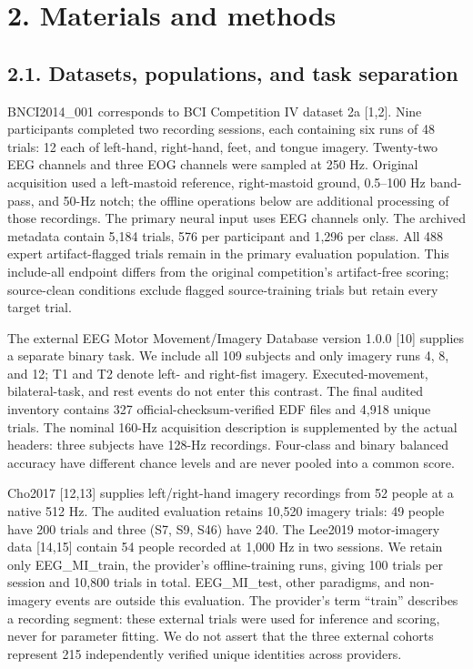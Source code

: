 \documentclass[11pt]{article}
\begin{document}
\section*{2. Materials and methods}
\subsection*{2.1. Datasets, populations, and task separation}
BNCI2014\_001 corresponds to BCI Competition IV dataset 2a [1,2]. Nine participants completed two recording sessions, each containing six runs of 48 trials: 12 each of left-hand, right-hand, feet, and tongue imagery. Twenty-two EEG channels and three EOG channels were sampled at 250 Hz. Original acquisition used a left-mastoid reference, right-mastoid ground, 0.5--100 Hz band-pass, and 50-Hz notch; the offline operations below are additional processing of those recordings. The primary neural input uses EEG channels only. The archived metadata contain 5,184 trials, 576 per participant and 1,296 per class. All 488 expert artifact-flagged trials remain in the primary evaluation population. This include-all endpoint differs from the original competition's artifact-free scoring; source-clean conditions exclude flagged source-training trials but retain every target trial.

The external EEG Motor Movement/Imagery Database version 1.0.0 [10] supplies a separate binary task. We include all 109 subjects and only imagery runs 4, 8, and 12; T1 and T2 denote left- and right-fist imagery. Executed-movement, bilateral-task, and rest events do not enter this contrast. The final audited inventory contains 327 official-checksum-verified EDF files and 4,918 unique trials. The nominal 160-Hz acquisition description is supplemented by the actual headers: three subjects have 128-Hz recordings. Four-class and binary balanced accuracy have different chance levels and are never pooled into a common score.

Cho2017 [12,13] supplies left/right-hand imagery recordings from 52 people at a native 512 Hz. The audited evaluation retains 10,520 imagery trials: 49 people have 200 trials and three (S7, S9, S46) have 240. The Lee2019 motor-imagery data [14,15] contain 54 people recorded at 1,000 Hz in two sessions. We retain only EEG\_MI\_train, the provider's offline-training runs, giving 100 trials per session and 10,800 trials in total. EEG\_MI\_test, other paradigms, and non-imagery events are outside this evaluation. The provider's term ``train'' describes a recording segment: these external trials were used for inference and scoring, never for parameter fitting. We do not assert that the three external cohorts represent 215 independently verified unique identities across providers.
\end{document}
